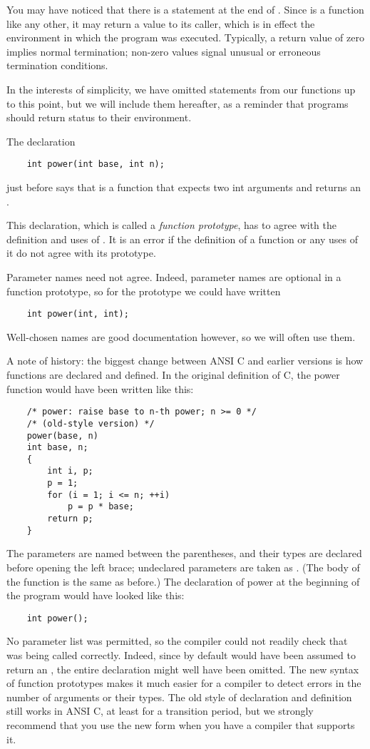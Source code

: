 You may have noticed that there is a  statement at the end of .
Since  is a function like any other, it may return a value to its caller, which is in effect the environment in which the program was executed.
Typically, a return value of zero implies normal termination; non-zero values signal unusual or erroneous termination conditions.

In the interests of simplicity, we have omitted  statements from our  functions up to this point, but we will include them hereafter, as a reminder that programs should return status to their environment.

The declaration
\begin{lstlisting}
	int power(int base, int n);
\end{lstlisting}
just before  says that  is a function that expects two int arguments and returns an .

This declaration, which is called a \emph{function prototype}, has to agree with the definition and uses of .
It is an error if the definition of a function or any uses of it do not agree with its prototype.

Parameter names need not agree.
Indeed, parameter names are optional in a function prototype, so for the prototype we could have written
\begin{lstlisting}
	int power(int, int);
\end{lstlisting}
Well-chosen names are good documentation however, so we will often use them.

A note of history: the biggest change between ANSI C and earlier versions is how functions are declared and defined.
In the original definition of C, the power function would have been written like this:

\begin{lstlisting}
	/* power: raise base to n-th power; n >= 0 */
	/* (old-style version) */
	power(base, n)
	int base, n;
	{
		int i, p;
		p = 1;
		for (i = 1; i <= n; ++i)
			p = p * base;
		return p;
	}
\end{lstlisting}

The parameters are named between the parentheses, and their types are declared before opening the left brace; undeclared parameters are taken as . (The body of the function is the same as before.)
The declaration of power at the beginning of the program would have looked like this:
\begin{lstlisting}
	int power();
\end{lstlisting}
No parameter list was permitted, so the compiler could not readily check that  was being called correctly.
Indeed, since by default  would have been assumed to return an , the entire declaration might well have been omitted.
The new syntax of function prototypes makes it much easier for a compiler to detect errors in the number of arguments or their types.
The old style of declaration and definition still works in ANSI C, at least for a transition period, but we strongly recommend that you use the new form when you have a compiler that supports it.
\newline

